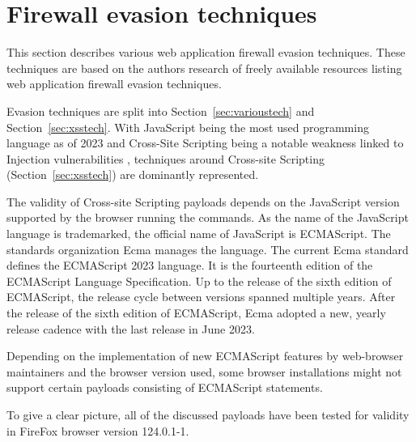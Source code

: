 \section{Firewall evasion techniques}
\label{sec:firewallevasiontechniques}

This section describes various web application firewall evasion techniques. These techniques are based on the authors research of freely available resources listing web application firewall evasion techniques.

Evasion techniques are split into Section~\ref{sec:varioustech} and Section~\ref{sec:xsstech}. With JavaScript being the most used programming language as of 2023 \cite{statista/mostusedlang} and Cross-Site Scripting being a notable weakness linked to Injection vulnerabilities \cite{OWASP/Injection21}, techniques around Cross-site Scripting (Section~\ref{sec:xsstech}) are dominantly represented.

The validity of Cross-site Scripting payloads depends on the JavaScript version supported by the browser running the commands. As the name of the JavaScript language is trademarked, the official name of JavaScript is ECMAScript. The standards organization Ecma manages the language. The current Ecma standard defines the ECMAScript 2023 language. It is the fourteenth edition of the ECMAScript Language Specification. Up to the release of the sixth edition of ECMAScript, the release cycle between versions spanned multiple years. After the release of the sixth edition of ECMAScript, Ecma adopted a new, yearly release cadence with the last release in June 2023. \cite{ecma/release,ecma/intro,explorejs/ecmascript}

Depending on the implementation of new ECMAScript features by web-browser maintainers and the browser version used, some browser installations might not support certain payloads consisting of ECMAScript statements. \cite{kangax/compattable}

To give a clear picture, all of the discussed payloads have been tested for validity in FireFox browser version 124.0.1-1.

